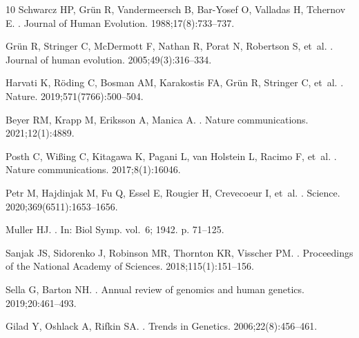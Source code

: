 \documentclass[10pt,letterpaper]{article}
\begin{document}
\begin{thebibliography}{10}
Schwarcz HP, Gr{\"u}n R, Vandermeersch B, Bar-Yosef O, Valladas H, Tchernov E.
.
\newblock Journal of Human Evolution. 1988;17(8):733--737.

Gr{\"u}n R, Stringer C, McDermott F, Nathan R, Porat N, Robertson S, et~al.
.
\newblock Journal of human evolution. 2005;49(3):316--334.

Harvati K, R{\"o}ding C, Bosman AM, Karakostis FA, Gr{\"u}n R, Stringer C,
  et~al.
.
\newblock Nature. 2019;571(7766):500--504.

Beyer RM, Krapp M, Eriksson A, Manica A.
.
\newblock Nature communications. 2021;12(1):4889.

Posth C, Wi{\ss}ing C, Kitagawa K, Pagani L, van Holstein L, Racimo F, et~al.
.
\newblock Nature communications. 2017;8(1):16046.

Petr M, Hajdinjak M, Fu Q, Essel E, Rougier H, Crevecoeur I, et~al.
.
\newblock Science. 2020;369(6511):1653--1656.

Muller HJ.
.
\newblock In: Biol Symp. vol.~6; 1942. p. 71--125.

Sanjak JS, Sidorenko J, Robinson MR, Thornton KR, Visscher PM.
.
\newblock Proceedings of the National Academy of Sciences.
  2018;115(1):151--156.

Sella G, Barton NH.
.
\newblock Annual review of genomics and human genetics. 2019;20:461--493.

Gilad Y, Oshlack A, Rifkin SA.
.
\newblock Trends in Genetics. 2006;22(8):456--461.


\end{thebibliography}
\end{document}
